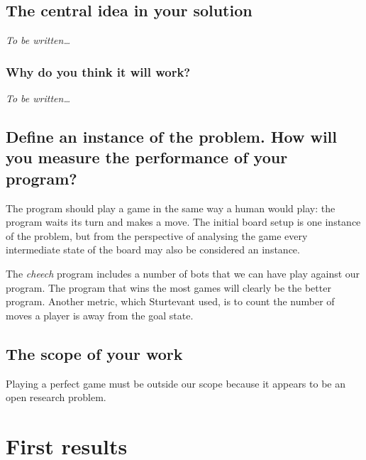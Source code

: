 \documentclass[a4paper,11pt]{report}
\begin{document}
\section{The central idea in your solution}

\emph{To be written\dots}

\subsection{Why do you think it will work?}

\emph{To be written\dots}

\section{Define an instance of the problem. How will you measure the performance of your program?} 

The program should play a game in the same way a human would play: the
program waits its turn and makes a move. The initial board setup is
one instance of the problem, but from the perspective of analysing the
game every intermediate state of the board may also be considered an
instance.

The \emph{cheech} program includes a number of bots that we can have
play against our program. The program that wins the most games will
clearly be the better program. Another metric, which Sturtevant used,
is to count the number of moves a player is away from the goal state.

\section{The scope of your work} 

Playing a perfect game must be outside our scope because it appears to
be an open research problem.

\chapter{First results}
\end{document}

